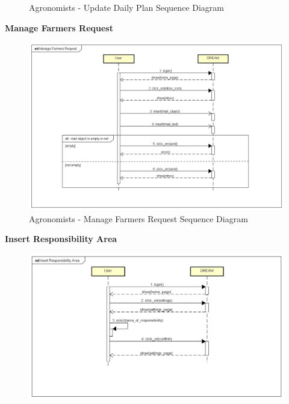 \documentclass[table, 12pt]{article}
\begin{document}
\begin{itemize}
\begin{center}
\begin{figure}[H]
                    \caption{Agronomists - Update Daily Plan Sequence Diagram}
                    \label{fig: sdAgronomist_updateDailyPlan}
                \end{figure}
            \end{center}
            \newpage
            \textbf{Manage Farmers Request}\\
            \begin{center}
                \begin{figure}[H]
                    \includegraphics[scale=0.60, center]{assets/Sequence diagrams/Agronomist/Manage Farmers Request.png}
                    \caption{Agronomists - Manage Farmers Request Sequence Diagram}
                    \label{fig: sdAgronomist_manageFarmersRequest}
                \end{figure}
            \end{center}
            \newpage
            \textbf{Insert Responsibility Area}\\
            \begin{center}
                \begin{figure}[H]
                    \includegraphics[scale=0.65, center]{assets/Sequence diagrams/Agronomist/Insert Responsibility Area.png}

\end{figure}
\end{center}
\end{itemize}
\end{document}
